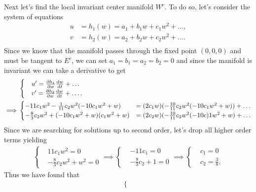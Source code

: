 \documentclass[12pt]{report}
\begin{document}
\begin{solution}
\begin{enumerate}
        Next let's find the local invariant center manifold $W^c$. To do so, let's consider the system of equations 
        \begin{align*}
            u &= h_1(w) = a_1 + b_1 w + c_1 w^2 + \dots,\\
            v &= h_2(w) = a_2 + b_2 w + c_2 w^2 + \dots.\\
        \end{align*}
        Since we know that the manifold passes through the fixed point $(0,0,0)$ and must be tangent to $E^c$, we can set $a_1 = b_1 = a_2 = b_2 = 0$ and since the manifold is invariant we can take a derivative to get
        \begin{align*}
            &\begin{cases}
                &u' = \frac{\partial h_1}{\partial w}\frac{\mathrm{d} w}{\mathrm{d} t} + \dots\\
                &v' = \frac{\partial h_2}{\partial w}\frac{\mathrm{d} w}{\mathrm{d} t} + \dots.    
            \end{cases}\\
            \implies &\begin{cases}
                -11c_1 w^2 - \frac{1}{11}c_2w^2(-10c_1w^2 + w) &= (2c_1w)(-\frac{10}{11}c_2w^2(-10c_1w^2 + w)) + \dots\\
                -\frac{8}{3}c_2w^2 + (-10c_1w^2 + w)(c_1w^2 + w) &= (2c_2w)(-\frac{10}{11}c_2w^2(-10c)1w^2 + w) + \dots
            \end{cases}
        \end{align*} 
        Since we are searching for solutions up to second order, let's drop all higher order terms yielding 
        \begin{align*}
            \begin{cases}
                &11c_1 w^2 = 0\\
                &-\frac{8}{3}c_2w^2 + w^2 = 0
            \end{cases} \implies \begin{cases}
                &-11c_1 = 0\\
                &-\frac{8}{3}c_2 + 1 = 0
            \end{cases} \implies \begin{cases}
                &c_1 = 0\\
                &c_2 = \frac{3}{8}.
            \end{cases}
        \end{align*}
        Thus we have found that 
        \begin{align*}
            \begin{cases}

\end{cases}
\end{align*}
\end{enumerate}
\end{solution}
\end{document}
